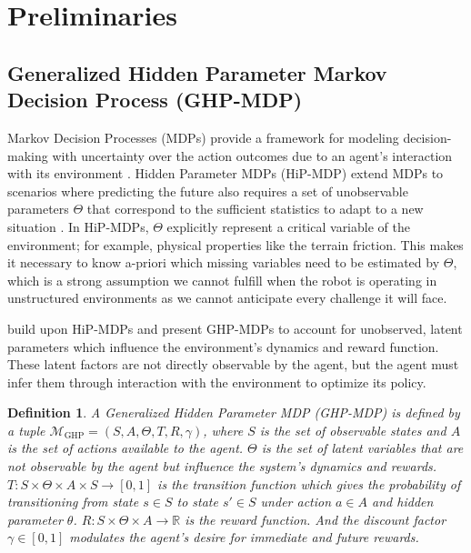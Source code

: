 \documentclass[Afour,sageh,times]{sagej}
\newtheorem{definition}{Definition}
\theoremstyle{lemma}
\begin{document}
\section{Preliminaries} \label{sec:preliminaries}

\subsection{Generalized Hidden Parameter Markov Decision Process (GHP-MDP)} \label{sec:prelim-ghpmdp}

Markov Decision Processes (MDPs) provide a framework for modeling decision-making with uncertainty over the action outcomes due to an agent's interaction with its environment \cite[]{sutton2018reinforcement}. Hidden Parameter MDPs (HiP-MDP) extend MDPs to scenarios where predicting the future also requires a set of unobservable parameters $\Theta$ that correspond to the sufficient statistics to adapt to a new situation \cite[]{doshi2016hidden}. In HiP-MDPs, $\Theta$ explicitly represent a critical variable of the environment; for example, physical properties like the terrain friction. This makes it necessary to know a-priori which missing variables need to be estimated by $\Theta$, which is a strong assumption we cannot fulfill when the robot is operating in unstructured environments as we cannot anticipate every challenge it will face.

\cite{perez2020generalized} build upon HiP-MDPs and present GHP-MDPs to account for unobserved, latent parameters which influence the environment's dynamics and reward function. These latent factors are not directly observable by the agent, but the agent must infer them through interaction with the environment to optimize its policy.

\begin{definition} \label{def:ghp-mdp}
A Generalized Hidden Parameter MDP (GHP-MDP) is defined by a tuple $\mathcal{M}_{\text{GHP}} = \left( S, A, \Theta, T, R, \gamma \right)$, where \( S \) is the set of \textit{observable states} and \( A \) is the set of \textit{actions} available to the agent. \( \Theta \) is the set of \textit{latent variables} that are not observable by the agent but influence the system’s dynamics and rewards. \( T: S \times \Theta \times A \times S \to [0, 1] \) is the \textit{transition function} which gives the probability of transitioning from state \( s \in S \) to state \( s' \in S \) under action \( a \in A \) and hidden parameter \( \theta \). \( R: S \times \Theta \times A \to \mathbb{R} \) is the \textit{reward function}. And the discount factor \( \gamma \in [0, 1] \) modulates the agent's desire for immediate and future rewards.
\end{definition}
\end{document}

